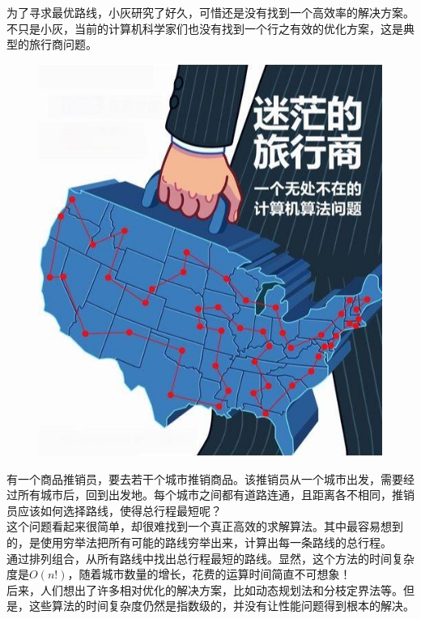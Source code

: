 为了寻求最优路线，小灰研究了好久，可惜还是没有找到一个高效率的解决方案。\\

不只是小灰，当前的计算机科学家们也没有找到一个行之有效的优化方案，这是典型的旅行商问题。

\begin{figure}[H]
	\centering
	\includegraphics[scale=0.4]{img/Chapter11/11-5/1.png}
\end{figure}

有一个商品推销员，要去若干个城市推销商品。该推销员从一个城市出发，需要经过所有城市后，回到出发地。每个城市之间都有道路连通，且距离各不相同，推销员应该如何选择路线，使得总行程最短呢？\\

这个问题看起来很简单，却很难找到一个真正高效的求解算法。其中最容易想到的，是使用穷举法把所有可能的路线穷举出来，计算出每一条路线的总行程。\\

通过排列组合，从所有路线中找出总行程最短的路线。显然，这个方法的时间复杂度是$ O(n!) $，随着城市数量的增长，花费的运算时间简直不可想象！\\

后来，人们想出了许多相对优化的解决方案，比如动态规划法和分枝定界法等。但是，这些算法的时间复杂度仍然是指数级的，并没有让性能问题得到根本的解决。\\

